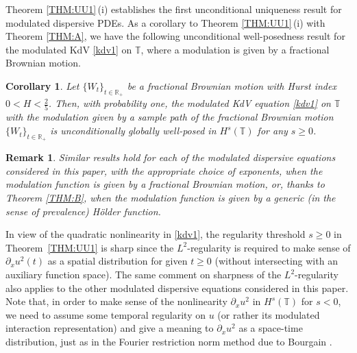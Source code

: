 \documentclass[letterpaper, 11pt,  reqno]{amsart}
\newtheorem{remark}[theorem]{Remark}
\newtheorem{corollary}[theorem]{Corollary}
\newcommand{\1}{\hspace{0.5mm}\text{I}\hspace{0.5mm}}
\newcommand{\noi}{\noindent}
\newcommand{\R}{\mathbb{R}}
\newcommand{\T}{\mathbb{T}}
\newcommand{\dx}{\partial_x}
\numberwithin{equation}{section}
\numberwithin{theorem}{section}
\begin{document}
Theorem \ref{THM:UU1}\,(i) establishes the first unconditional uniqueness
result for modulated dispersive PDEs.
As a corollary to Theorem \ref{THM:UU1}\,(i)
with Theorem \ref{THM:A}, we have
the following unconditional well-posedness
result for the modulated KdV \eqref{kdv1} on $\T$, 
where a modulation is given by a fractional Brownian motion.


\begin{corollary}\label{COR:1}
Let $\{W_t\}_{t\in \R_+}$ be a fractional Brownian motion 
with Hurst index $0 < H < \frac 25$.
%
Then, 
with probability one, 
the modulated KdV equation \eqref{kdv1}
on  $\T$
with the modulation given by 
a sample path of the
 fractional Brownian motion 
 $\{W_t\}_{t\in \R_+}$
is unconditionally globally well-posed in $H^s(\T)$
for any $s \ge 0$.




\end{corollary}

\begin{remark}\rm
Similar results hold for each of the modulated dispersive equations considered in this paper, with the appropriate choice of exponents, when the modulation function is given by a fractional Brownian motion, or,  thanks to Theorem \ref{THM:B}, when the modulation function is given by a generic (in the sense of prevalence) H\"older function.
\end{remark}








In view of  the quadratic nonlinearity in \eqref{kdv1}, 
the regularity threshold $s \ge 0$ 
in Theorem~\ref{THM:UU1}
is sharp since the $L^2$-regularity is required to make
sense of $\dx u^2(t)$ as a spatial distribution for given $t \ge 0$
(without intersecting with an auxiliary function space).
The same comment on sharpness of the $L^2$-regularity
also applies to the other modulated dispersive equations
considered in this paper.
Note that, in order to make sense of the nonlinearity $\dx u^2$
in $H^s(\T)$ for $s < 0$, we need to 
assume
some temporal regularity on $u$
(or rather its modulated interaction representation)
and give a meaning to $\dx u^2$ as a space-time distribution, 
just as in the Fourier restriction norm method due to Bourgain \cite{BO93}.
\end{document}

